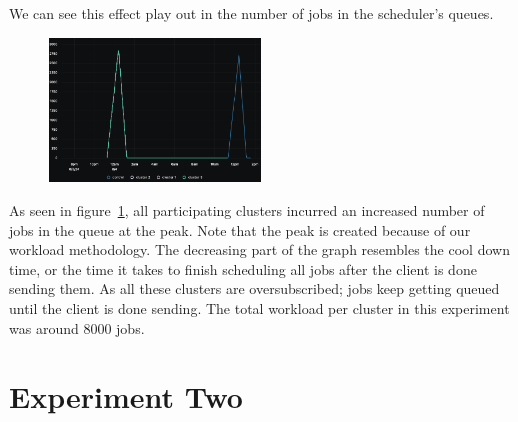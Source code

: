We can see this effect play out in the number of jobs in the scheduler's queues.
\begin{figure}[H]
  \begin{center}
    \includegraphics[width=0.5\textwidth]{./figures/experiment-one/jobs-in-queue.png}
  \end{center}
  \caption{}\label{fig:exp-1-jobs-in-queue}
\end{figure}

As seen in figure~\ref{fig:exp-1-jobs-in-queue}, all participating
clusters incurred an increased number of jobs in the queue at the peak. Note
that the peak is created because of our workload methodology. The decreasing
part of the graph resembles the cool down time, or the time it takes to finish
scheduling all jobs after the client is done sending them. As all these clusters
are oversubscribed; jobs keep getting queued until the client is done 
sending. The total workload per cluster in this experiment was around 8000
jobs. 

\section{Experiment Two}

\begin{center}
\end{center}

